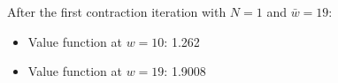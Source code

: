 After the first contraction iteration with $N=1$ and $\bar{w}=19$:
\begin{itemize}
\item Value function at $w=10$: 1.262
\item Value function at $w=19$: 1.9008
\end{itemize}
